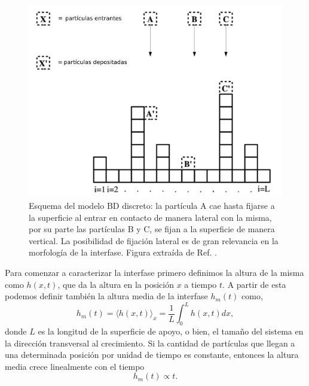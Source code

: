 \begin{figure}[t]
    \centering
    \includegraphics[width=\imsize]{BD.png}
    \caption[Esquema del modelo BD discreto.]{Esquema del modelo BD discreto: la partícula A cae hasta fijarse a la superficie al entrar en contacto de manera lateral con la 
    misma, por su parte las partículas B y C, se fijan a la superficie de manera vertical. La posibilidad de fijación lateral es de gran relevancia en la morfología 
    de la interfase. Figura extraída de Ref. \cite{farahzadi2008systematic}.}
    \label{fig:bd}
\end{figure}


Para comenzar a caracterizar la interfase primero definimos la altura de la misma como $h(x,t)$, que da la altura en la posición $x$ a tiempo $t$. A partir de esta 
podemos definir también la altura media de la interfase $h_m(t)$ como,
\begin{equation}
h_{m}(t) = \langle h(x,t) \rangle_x =  \frac{1}{L}\int_{0}^{L}h(x,t)dx,
\end{equation}
donde $L$ es la longitud de la superficie de apoyo, o bien, el tamaño del sistema en la dirección transversal al crecimiento. Si la cantidad de partículas que llegan a una determinada posición por unidad de tiempo es constante, entonces la altura media crece linealmente con el tiempo
\begin{equation}
    h_{m}(t) \propto t.
\end{equation}

